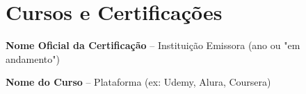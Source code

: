 \documentclass[a4paper,10pt]{article}
\begin{document}
%
%

\section*{Cursos e Certificações}

\textbf{Nome Oficial da Certificação} -- Instituição Emissora (ano ou "em andamento")

\textbf{Nome do Curso} -- Plataforma (ex: Udemy, Alura, Coursera)


%
%
\end{document}
